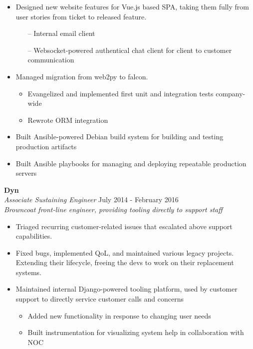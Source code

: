 \begin{itemize}
  \item Designed new website features for Vue.js based SPA, taking them fully from user stories from ticket to released feature.
    \begin{itemize}
      \item[--] Internal email client
      \item[--] Websocket-powered authentical chat client for client to customer communication
    \end{itemize}
  \item Managed migration from web2py to falcon.
    \begin{itemize}
      \item Evangelized and implemented first unit and integration tests company-wide
      \item Rewrote ORM integration
    \end{itemize}
  \item Built Ansible-powered Debian build system for building and testing production artifacts
  \item Built Ansible playbooks for managing and deploying repeatable production servers
\end{itemize}

\begin{minipage}{\textwidth}
  \large{\textbf{Dyn}} \\
  \textit{Associate Sustaining Engineer} \hfill July 2014 - February 2016 \\[3.75pt]
  \textit{Browncoat front-line engineer, providing tooling directly to support staff}
\end{minipage}

\begin{itemize}
  \item Triaged recurring customer-related issues that escalated above support capabilities.
  \item Fixed bugs, implemented QoL, and maintained various legacy projects. Extending their lifecycle, freeing the devs to work on their replacement systems.
  \item Maintained internal Django-powered tooling platform, used by customer support to directly service customer calls and concerns
    \begin{itemize}
      \item Added new functionality in response to changing user needs
      \item Built instrumentation for visualizing system help in collaboration with NOC
    \end{itemize}
\end{itemize}
